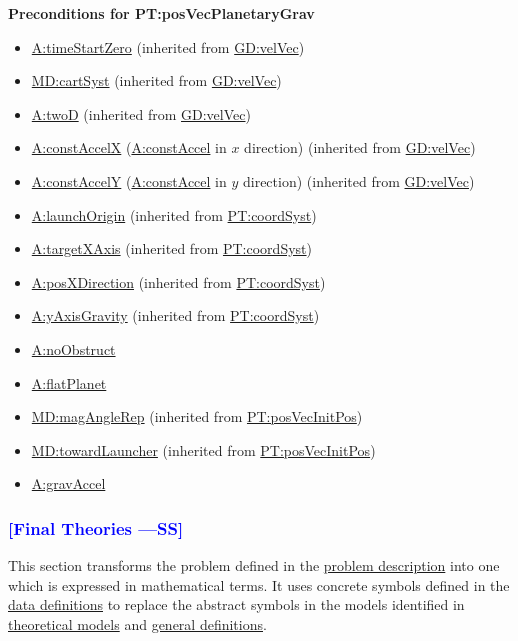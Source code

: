 \documentclass[12pt]{article}
\newcommand{\authornote}[3]{\textcolor{#1}{[#3 ---#2]}}
\newcommand{\authornote}[3]{}
\newcommand{\wss}[1]{\authornote{blue}{SS}{#1}}
\begin{document}
\noindent \textbf{Preconditions for PT:posVecPlanetaryGrav} 
\begin{itemize} 
\item \hyperref[timeStartZero]{A:timeStartZero} (inherited from
\hyperref[GD:velVec]{GD:velVec}) 
\item \hyperref[MD:cartSyst]{MD:cartSyst} (inherited from
\hyperref[GD:velVec]{GD:velVec}) 
\item \hyperref[twoD]{A:twoD} (inherited from \hyperref[GD:velVec]{GD:velVec}) 
\item \hyperref[constAccelX]{A:constAccelX} (\hyperref[constAccel]{A:constAccel}
in $x$ direction) (inherited from \hyperref[GD:velVec]{GD:velVec}) 
\item \hyperref[constAccelY]{A:constAccelY} (\hyperref[constAccel]{A:constAccel}
in $y$ direction) (inherited from \hyperref[GD:velVec]{GD:velVec}) 
\item \hyperref[launchOrigin]{A:launchOrigin} (inherited from
\hyperref[PT:coordSyst]{PT:coordSyst}) 
\item \hyperref[targetXAxis]{A:targetXAxis} (inherited from
\hyperref[PT:coordSyst]{PT:coordSyst}) 
\item \hyperref[posXDirection]{A:posXDirection} (inherited from
\hyperref[PT:coordSyst]{PT:coordSyst}) 
\item \hyperref[yAxisGravity]{A:yAxisGravity} (inherited from
\hyperref[PT:coordSyst]{PT:coordSyst}) 
\item \hyperref[noObstruct]{A:noObstruct}
\item \hyperref[flatPlanet]{A:flatPlanet}
\item \hyperref[MD:magAngleRep]{MD:magAngleRep} (inherited from \hyperref[PT:posVecInitPos]{PT:posVecInitPos})
\item \hyperref[MD:towardLauncher]{MD:towardLauncher} (inherited from \hyperref[PT:posVecInitPos]{PT:posVecInitPos})
\item \hyperref[gravAccel]{A:gravAccel}
\end{itemize}

\subsubsection{\wss{Final Theories}} \label{Sec:IMs} This section transforms the
problem defined in the \hyperref[Sec:ProbDesc]{problem description} into one
which is expressed in mathematical terms. It uses concrete symbols defined in
the \hyperref[Sec:DDs]{data definitions} to replace the abstract symbols in the
models identified in \hyperref[Sec:TMs]{theoretical models} and
\hyperref[Sec:GDs]{general definitions}.
\end{document}
